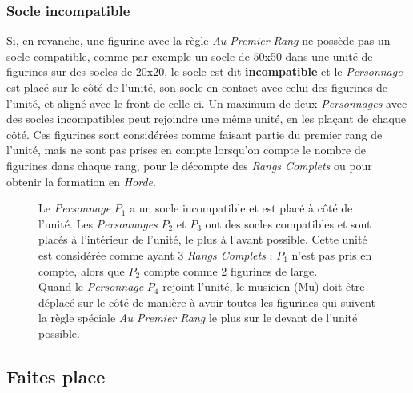 \subsubsection*{Socle incompatible}
Si, en revanche, une figurine avec la règle \emph{Au Premier Rang} ne possède pas un socle compatible, comme par exemple un socle de $ 50 $x\unit{50}{\milli\meter} dans une unité de figurines sur des socles de $ 20 $x\unit{20}{\milli\meter}, le socle est dit \textbf{incompatible} et le \emph{Personnage} est placé sur le côté de l'unité, son socle en contact avec celui des figurines de l'unité, et aligné avec le front de celle-ci. Un maximum de deux \emph{Personnages} avec des socles incompatibles peut rejoindre une même unité, en les plaçant de chaque côté. Ces figurines sont considérées comme faisant partie du premier rang de l'unité, mais ne sont pas prises en compte lorsqu'on compte le nombre de figurines dans chaque rang, pour le décompte des \emph{Rangs Complets} ou pour obtenir la formation en \emph{Horde}.

\begin{figure}[!htbp]
\centering
\def\svgwidth{12cm}

\caption{Le \emph{Personnage} $ P_{1} $ a un socle incompatible et est placé à côté de l'unité. Les \emph{Personnages} $ P_{2} $ et $ P_{3} $ ont des socles compatibles et sont placés à l'intérieur de l'unité, le plus à l'avant possible. Cette unité est considérée comme ayant 3 \emph{Rangs Complets} : $ P_{1} $ n'est pas pris en compte, alors que $ P_{2} $ compte comme 2 figurines de large. \\
Quand le \emph{Personnage} $ P_{4} $ rejoint l'unité, le musicien (Mu) doit être déplacé sur le côté de manière à avoir toutes les figurines qui suivent la règle spéciale \emph{Au Premier Rang} le plus sur le devant de l'unité possible.}
\label{figure/au_premier_rang}
\end{figure}

\subsection{Faites place}



